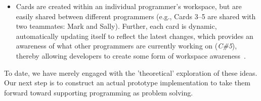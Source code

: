 \begin{itemize}
	\item Cards are created within an individual programmer's workspace, but are easily shared between different programmers (e.g., Cards 3--5 are shared with two teammates: Mark and Sally). Further, each card is dynamic, automatically updating itself to reflect the latest changes, which provides an awareness of what other programmers are currently working on (\textit{C\#5}), thereby allowing developers to create some form of workspace awareness~\cite{dasilva2006lighthouse}.
\end{itemize}

To date, we have merely engaged with the 'theoretical' exploration of these ideas.
Our next step is to construct an actual prototype implementation to take them forward toward supporting programming as problem solving. 